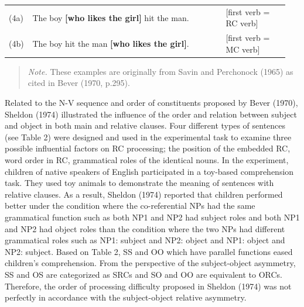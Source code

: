 \documentclass[
]{article}
\begin{document}
\vspace{1em}

\setlength{\parindent}{0pt}
\noindent
\begin{tabular}[t]{@{}p{0.06\linewidth} p{0.67\linewidth} >{\raggedleft\arraybackslash}p{0.22\linewidth}@{}}
(4a) & The boy \textbf{[who likes the girl]} hit the man. & {\small [first verb = RC verb]} \\
(4b) & The boy hit the man \textbf{[who likes the girl]}. & {\small [first verb = MC verb]} \\
\end{tabular}

\vspace{0.5em}

\noindent
\begin{quote}
\small
\textit{Note.} These examples are originally from Savin and Perchonock (1965) as cited in Bever (1970, p.295).
\end{quote}

\vspace{1em}

Related to the N-V sequence and order of constituents proposed by Bever
(1970), Sheldon (1974) illustrated the influence of the order and
relation between subject and object in both main and relative clauses.
Four different types of sentences (see Table 2) were designed and used
in the experimental task to examine three possible influential factors
on RC processing; the position of the embedded RC, word order in RC,
grammatical roles of the identical nouns. In the experiment, children of
native speakers of English participated in a toy-based comprehension
task. They used toy animals to demonstrate the meaning of sentences with
relative clauses. As a result, Sheldon (1974) reported that children
performed better under the condition where the co-referential NPs had
the same grammatical function such as both NP1 and NP2 had subject roles
and both NP1 and NP2 had object roles than the condition where the two
NPs had different grammatical roles such as NP1: subject and NP2: object
and NP1: object and NP2: subject. Based on Table 2, SS and OO which have
parallel functions eased children's comprehension. From the perspective
of the subject-object asymmetry, SS and OS are categorized as SRCs and
SO and OO are equivalent to ORCs. Therefore, the order of processing
difficulty proposed in Sheldon (1974) was not perfectly in accordance
with the subject-object relative asymmetry.

\clearpage

\vspace{1em}
\begingroup\fontsize{11}{13}\selectfont
\end{document}
